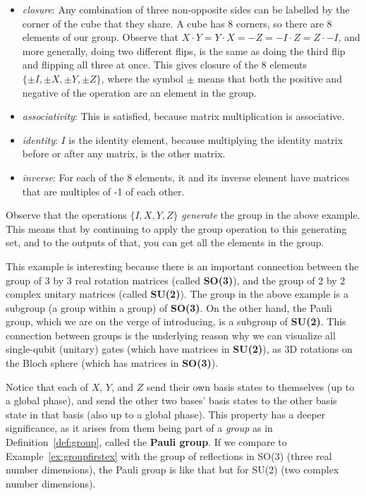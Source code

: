 \documentclass{article}
\theoremstyle{definition}
\begin{document}
\begin{example}
	\begin{itemize}
		\item \textit{closure}: \textnormal{Any combination of three non-opposite sides can be labelled by the corner of the cube that they share.  A cube has 8 corners, so there are 8 elements of our group.  Observe that $X \cdot Y = Y \cdot X = -Z = -I \cdot Z = Z \cdot -I$, and more generally, doing two different flips, is the same as doing the third flip and flipping all three at once.  This gives closure of the 8 elements $\{\pm I, \pm X, \pm Y, \pm Z\}$, where the symbol $\pm$ means that both the positive and negative of the operation are an element in the group.}
		\item \textit{associativity}: \textnormal{This is satisfied, because matrix multiplication is associative.}
		\item \textit{identity}: \textnormal{$I$ is the identity element, because multiplying the identity matrix before or after any matrix, is the other matrix.}
		\item \textit{inverse}: \textnormal{For each of the 8 elements, it and its inverse element have matrices that are multiples of -1 of each other.}
	\end{itemize}
\end{example}
Observe that the operations $\{I,X,Y,Z\}$ \textit{generate} the group in the above example.  This means that by continuing to apply the group operation to this generating set, and to the outputs of that, you can get all the elements in the group.

This example is interesting because there is an important connection between the group of 3 by 3 real rotation matrices (called \textbf{SO(3)}), and the group of 2 by 2 complex unitary matrices (called \textbf{SU(2)}).  The group in the above example is a subgroup (a group within a group) of \textbf{SO(3)}.  On the other hand, the Pauli group, which we are on the verge of introducing, is a subgroup of \textbf{SU(2)}.
This connection between groups is the underlying reason why we can visualize all single-qubit (unitary) gates (which have matrices in \textbf{SU(2)}), as 3D rotations on the Bloch sphere (which has matrices in \textbf{SO(3)}).

Notice that each of $X$, $Y$, and $Z$ send their own basis states to themselves (up to a global phase), and send the other two bases' basis states to the other basis state in that basis (also up to a global phase).
This property has a deeper significance, as it arises from them being part of a \textit{group} as in Definition~\ref{def:group}, called the \textbf{Pauli group}.
If we compare to Example~\ref{ex:groupfirstex} with the group of reflections in SO(3) (three real number dimensions), the Pauli group is like that but for SU(2) (two complex number dimensions).
\end{document}
